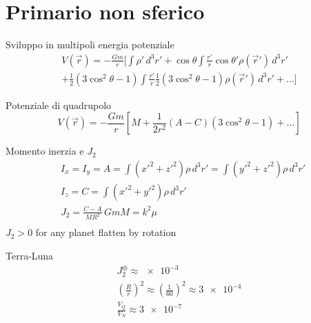 \section{Primario non sferico}

\begin{frame}{Sviluppo in multipoli energia potenziale}
\begin{align*}
V(\vec{r})=-\frac{Gm}{r}[\int\rho'\,d^3r'+\cos{\theta}\int\frac{r'}{r}\cos{\theta'}\rho(\vec{r}')\,d^3r'\\
+\frac{1}{2}(3\cos^2{\theta}-1)\int\frac{r'}{r}\frac{1}{2}(3\cos^2{\theta}-1)\rho(\vec{r}')\,d^3r'+\ldots]
\end{align*}
\begin{block}{Potenziale di quadrupolo}
\begin{equation*}
V(\vec{r})=-\frac{Gm}{r}[M+\frac{1}{2r^2}(A-C)(3\cos^2{\theta}-1)+\ldots]
\end{equation*}
\end{block}
\end{frame}

\begin{wordonframe}{Momento inerzia e $J_2$}
\begin{align*}
&I_x=I_y=A=\int(x'^2+z'^2)\rho\,d^3r'=\int(y'^2+z'^2)\rho\,d^3r'\\
&I_z=C=\int(x'^2+y'^2)\rho\,d^3r'\\
&J_2=\frac{C-A}{MR^2}\, GmM=k^2\mu\\
\end{align*}
$J_2>0$ for any planet flatten by rotation
\begin{block}{Terra-Luna}
\begin{align*}
J_2^{\oplus}\approx\num{e-3}\\
(\frac{R}{r})^2\approx(\frac{1}{60})^2\approx\num{3e-4}\\
\frac{V_Q}{V_N}\approx\num{3e-7}
\end{align*}
\end{block}
\end{wordonframe}

